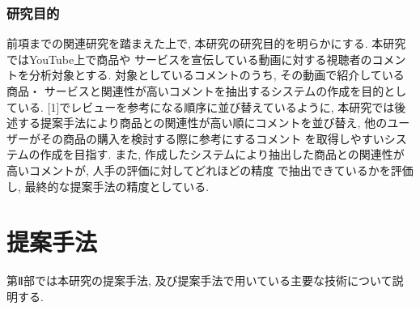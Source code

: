 \documentclass{ltjarticle}
\begin{document}
% 
% 
% 
% 
% 
% 

\newpage
\section{研究目的}
前項までの関連研究を踏まえた上で, 本研究の研究目的を明らかにする. 本研究ではYouTube上で商品や
サービスを宣伝している動画に対する視聴者のコメントを分析対象とする. 対象としているコメントのうち, その動画で紹介している商品・
サービスと関連性が高いコメントを抽出するシステムの作成を目的としている. [1]でレビューを参考になる順序に並び替えているように, 
本研究では後述する提案手法により商品との関連性が高い順にコメントを並び替え, 他のユーザーがその商品の購入を検討する際に参考にするコメント
を取得しやすいシステムの作成を目指す. また, 作成したシステムにより抽出した商品との関連性が高いコメントが, 人手の評価に対してどれほどの精度
で抽出できているかを評価し, 最終的な提案手法の精度としている. 

\newpage
\part{提案手法}
第Ⅱ部では本研究の提案手法, 及び提案手法で用いている主要な技術について説明する. 
\end{document}
